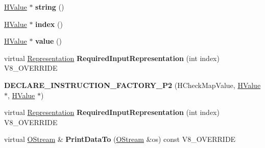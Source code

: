 \begin{DoxyCompactItemize}
\item 
\hypertarget{classv8_1_1internal_1_1_v8___f_i_n_a_l_a482bad72a42e6ef846dabfc094263e5c}{}\hyperlink{classv8_1_1internal_1_1_h_value}{H\+Value} $\ast$ {\bfseries string} ()\label{classv8_1_1internal_1_1_v8___f_i_n_a_l_a482bad72a42e6ef846dabfc094263e5c}

\item 
\hypertarget{classv8_1_1internal_1_1_v8___f_i_n_a_l_a72d9d990080b4fb1293434e195478f65}{}\hyperlink{classv8_1_1internal_1_1_h_value}{H\+Value} $\ast$ {\bfseries index} ()\label{classv8_1_1internal_1_1_v8___f_i_n_a_l_a72d9d990080b4fb1293434e195478f65}

\item 
\hypertarget{classv8_1_1internal_1_1_v8___f_i_n_a_l_aa08abac54342303f176acc9aa582f08d}{}\hyperlink{classv8_1_1internal_1_1_h_value}{H\+Value} $\ast$ {\bfseries value} ()\label{classv8_1_1internal_1_1_v8___f_i_n_a_l_aa08abac54342303f176acc9aa582f08d}

\item 
\hypertarget{classv8_1_1internal_1_1_v8___f_i_n_a_l_a6c6d1f37f40b113d8f4062f1ffff7215}{}virtual \hyperlink{classv8_1_1internal_1_1_representation}{Representation} {\bfseries Required\+Input\+Representation} (int index) V8\+\_\+\+O\+V\+E\+R\+R\+I\+D\+E\label{classv8_1_1internal_1_1_v8___f_i_n_a_l_a6c6d1f37f40b113d8f4062f1ffff7215}

\item 
\hypertarget{classv8_1_1internal_1_1_v8___f_i_n_a_l_ad095cd9d9c4bcda7c37bdd802ba06ddd}{}{\bfseries D\+E\+C\+L\+A\+R\+E\+\_\+\+I\+N\+S\+T\+R\+U\+C\+T\+I\+O\+N\+\_\+\+F\+A\+C\+T\+O\+R\+Y\+\_\+\+P2} (H\+Check\+Map\+Value, \hyperlink{classv8_1_1internal_1_1_h_value}{H\+Value} $\ast$, \hyperlink{classv8_1_1internal_1_1_h_value}{H\+Value} $\ast$)\label{classv8_1_1internal_1_1_v8___f_i_n_a_l_ad095cd9d9c4bcda7c37bdd802ba06ddd}

\item 
\hypertarget{classv8_1_1internal_1_1_v8___f_i_n_a_l_a6c6d1f37f40b113d8f4062f1ffff7215}{}virtual \hyperlink{classv8_1_1internal_1_1_representation}{Representation} {\bfseries Required\+Input\+Representation} (int index) V8\+\_\+\+O\+V\+E\+R\+R\+I\+D\+E\label{classv8_1_1internal_1_1_v8___f_i_n_a_l_a6c6d1f37f40b113d8f4062f1ffff7215}

\item 
\hypertarget{classv8_1_1internal_1_1_v8___f_i_n_a_l_ac450dad970b14246be761ccf5004924b}{}virtual \hyperlink{classv8_1_1internal_1_1_o_stream}{O\+Stream} \& {\bfseries Print\+Data\+To} (\hyperlink{classv8_1_1internal_1_1_o_stream}{O\+Stream} \&os) const V8\+\_\+\+O\+V\+E\+R\+R\+I\+D\+E\label{classv8_1_1internal_1_1_v8___f_i_n_a_l_ac450dad970b14246be761ccf5004924b}


\end{DoxyCompactItemize}
